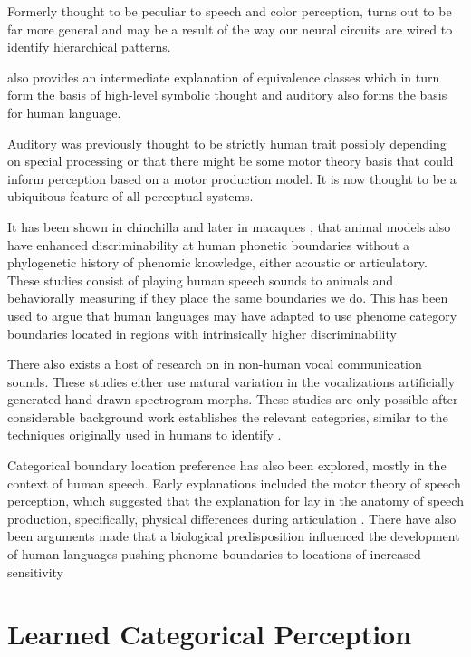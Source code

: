 Formerly thought to be peculiar to speech and color perception, \CP turns out to be far more general and may be a result of the way our neural circuits are wired to identify hierarchical patterns.

\CP also provides an intermediate explanation of equivalence classes which in turn form the basis of high-level symbolic thought and auditory \CP also forms the basis for human language.

Auditory \CP was previously thought to be strictly human trait possibly depending on special processing or that there might be some motor theory basis that could inform perception based on a motor production model. It is now thought to be a ubiquitous feature of all perceptual systems.

It has been shown in chinchilla \cite{kuhl1975speech} and later in macaques \cite{kuhl1983enhanced}, that animal models also have enhanced discriminability at human phonetic boundaries without a phylogenetic history of phenomic knowledge, either acoustic or articulatory.
These studies consist of playing human speech sounds to animals and behaviorally measuring if they place the same boundaries we do.
This has been used to argue that human languages may have adapted to use phenome category boundaries located in regions with intrinsically higher discriminability \cite{stevens1981constraints,goldstone2010categorical}

There also exists a host of research on \CP in non-human vocal communication sounds. These studies either use
natural variation in the vocalizations
artificially generated hand drawn spectrogram morphs.
These studies are only possible after considerable background work establishes the relevant categories, similar to the techniques originally used in humans to identify \CP.

Categorical boundary location preference has also been explored, mostly in the context of human speech. Early explanations included the motor theory of speech perception, which suggested that the explanation for \CP lay in the anatomy of speech production, specifically, physical differences during articulation \cite{liberman1967perception}. There have also been arguments made that a biological predisposition influenced the development of human languages pushing phenome boundaries to locations of increased sensitivity \cite{stevens1981constraints, goldstone2010categorical, halle1979some}

\section{Learned Categorical Perception}

